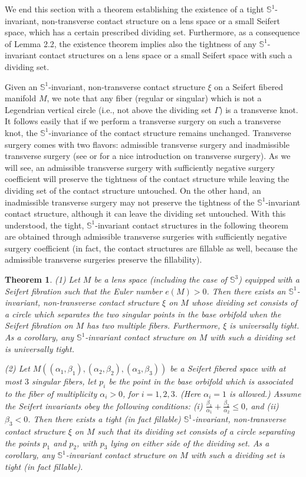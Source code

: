 \documentclass[11pt]{amsart}
\theoremstyle{plain}
\newtheorem{theorem}{Theorem}
\numberwithin{theorem}{section}
\theoremstyle{definition}
\newcommand{\s}{{\mathbb S}}
\begin{document}
We end this section with a theorem establishing the existence of a tight $\s^1$-invariant, non-transverse contact structure on a lens space or a small Seifert space, which has a certain 
prescribed dividing set. Furthermore, as a consequence of Lemma 2.2, the existence theorem implies also the tightness of any $\s^1$-invariant contact structures on a lens space or a small Seifert space with such a dividing set. 

Given an $\s^1$-invariant, non-transverse contact structure $\xi$ on a Seifert fibered manifold $M$,
we note that any fiber (regular or singular) which is not a Legendrian vertical circle (i.e., not above
the dividing set $\Gamma$) is a transverse knot. It follows easily that if we perform a transverse 
surgery on such a transverse knot, the $\s^1$-invariance of the contact structure remains unchanged. 
Transverse surgery comes with two flavors: admissible transverse surgery and inadmissible 
transverse surgery (see \cite{BE} or \cite{Con} for a nice introduction on transverse surgery). 
As we will see, an admissible transverse surgery with sufficiently negative surgery coefficient will
preserve the tightness of the contact structure while leaving the dividing set of the contact structure
untouched. On the other hand, an inadmissible transverse surgery may not preserve the tightness
of the $\s^1$-invariant contact structure, although it can leave the dividing set untouched. 
With this understood, the tight, $\s^1$-invariant contact structures in the following theorem are obtained through admissible transverse surgeries with sufficiently negative surgery coefficient (in fact, the contact structures are fillable as well, because the admissible transverse surgeries preserve the fillability). 

\begin{theorem}
{\em(}1{\em)} Let $M$ be a lens space {\em(}including the case of $\s^3${\em)} equipped with a Seifert fibration such that the Euler number $e(M)>0$. Then there exists an $\s^1$-invariant, non-transverse contact structure $\xi$ on $M$ whose dividing set consists of a circle which separates the two singular points in the base orbifold when the Seifert fibration on $M$ has two multiple fibers. Furthermore, $\xi$ is universally tight. As a corollary, any $\s^1$-invariant contact structure on $M$ with such a dividing set is universally tight. 

{\em(}2{\em)} Let $M((\alpha_1,\beta_1), (\alpha_2,\beta_2), (\alpha_3,\beta_3))$ be a Seifert fibered space with at most $3$ singular fibers,  let $p_i$ be the point in the base orbifold which is associated to the fiber of multiplicity 
$\alpha_i>0$, for $i=1,2,3$. (Here $\alpha_i=1$ is allowed.) Assume the Seifert invariants obey the following 
conditions: (i) $\frac{\beta_1}{\alpha_1}+\frac{\beta_2}{\alpha_2}\leq 0$, and (ii)
$\beta_3<0$. Then there exists a tight (in fact fillable) $\s^1$-invariant, non-transverse contact structure $\xi$ on $M$ such that its dividing set consists of a circle separating the points $p_1$ and $p_2$, with $p_3$ lying on either side of the dividing set. As a corollary, any $\s^1$-invariant contact structure on $M$ with such a dividing set 
is tight (in fact fillable). 
\end{theorem}
\end{document}

